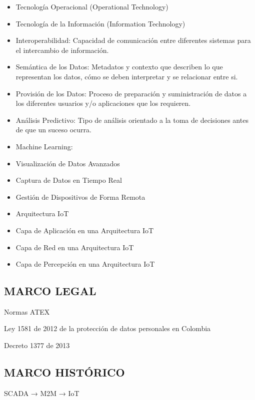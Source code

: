 \documentclass[stu,12pt,floatsintext]{apa7}
\begin{document}
\begin{itemize}
		\item Tecnología Operacional (Operational Technology)
		\item Tecnología de la Información (Information Technology)
		\item Interoperabilidad: Capacidad de comunicación entre diferentes sistemas para el intercambio de información.
		\item Semántica de los Datos: Metadatos y contexto que describen lo que representan los datos, cómo se deben interpretar y se relacionar entre si.
		\item Provisión de los Datos: Proceso de preparación y suministración de datos a los diferentes usuarios y/o aplicaciones que los requieren.
		\item Análisis Predictivo: Tipo de análisis orientado a la toma de decisiones antes de que un suceso ocurra.
		\item Machine Learning: 
		\item Visualización de Datos Avanzados
		\item Captura de Datos en Tiempo Real
		\item Gestión de Dispositivos de Forma Remota
		\item Arquitectura IoT
		\item Capa de Aplicación en una Arquitectura IoT
		\item Capa de Red en una Arquitectura IoT
		\item Capa de Percepción en una Arquitectura IoT
	\end{itemize}
	\subsection{MARCO LEGAL}
	Normas ATEX
	
	Ley 1581 de 2012 de la protección de datos personales en Colombia
	
	Decreto 1377 de 2013
	\subsection{MARCO HISTÓRICO}
	SCADA → M2M → IoT
	
\end{document}
